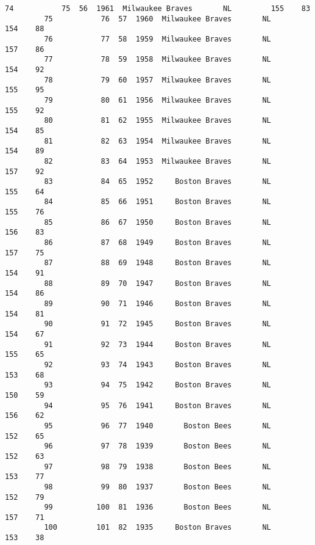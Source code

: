 \documentclass[11pt]{article}
\begin{document}
\begin{Verbatim}[commandchars=\\\{\}]
         74           75  56  1961  Milwaukee Braves       NL         155    83   
         75           76  57  1960  Milwaukee Braves       NL         154    88   
         76           77  58  1959  Milwaukee Braves       NL         157    86   
         77           78  59  1958  Milwaukee Braves       NL         154    92   
         78           79  60  1957  Milwaukee Braves       NL         155    95   
         79           80  61  1956  Milwaukee Braves       NL         155    92   
         80           81  62  1955  Milwaukee Braves       NL         154    85   
         81           82  63  1954  Milwaukee Braves       NL         154    89   
         82           83  64  1953  Milwaukee Braves       NL         157    92   
         83           84  65  1952     Boston Braves       NL         155    64   
         84           85  66  1951     Boston Braves       NL         155    76   
         85           86  67  1950     Boston Braves       NL         156    83   
         86           87  68  1949     Boston Braves       NL         157    75   
         87           88  69  1948     Boston Braves       NL         154    91   
         88           89  70  1947     Boston Braves       NL         154    86   
         89           90  71  1946     Boston Braves       NL         154    81   
         90           91  72  1945     Boston Braves       NL         154    67   
         91           92  73  1944     Boston Braves       NL         155    65   
         92           93  74  1943     Boston Braves       NL         153    68   
         93           94  75  1942     Boston Braves       NL         150    59   
         94           95  76  1941     Boston Braves       NL         156    62   
         95           96  77  1940       Boston Bees       NL         152    65   
         96           97  78  1939       Boston Bees       NL         152    63   
         97           98  79  1938       Boston Bees       NL         153    77   
         98           99  80  1937       Boston Bees       NL         152    79   
         99          100  81  1936       Boston Bees       NL         157    71   
         100         101  82  1935     Boston Braves       NL         153    38   
         

\end{Verbatim}
\end{document}
